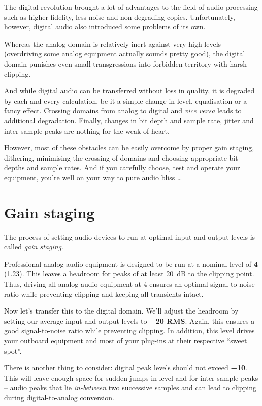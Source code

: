The digital revolution brought a lot of advantages to the field of
audio processing such as higher fidelity, less noise and non-degrading
copies.  Unfortunately, however, digital audio also introduced some
problems of its own.

Whereas the analog domain is relatively inert against very high levels
(overdriving some analog equipment actually sounds pretty good), the
digital domain punishes even small transgressions into forbidden
territory with harsh clipping.

And while digital audio can be transferred without loss in quality, it
is degraded by each and every calculation, be it a simple change in
level, equalisation or a fancy effect.  Crossing domains from analog
to digital and \emph{vice versa} leads to additional degradation.
Finally, changes in bit depth and sample rate, jitter and inter-sample
peaks are nothing for the weak of heart.

However, most of these obstacles can be easily overcome by proper gain
staging, dithering, minimising the crossing of domains and choosing
appropriate bit depths and sample rates.  And if you carefully choose,
test and operate your equipment, you're well on your way to pure audio
bliss \dots

\section{Gain staging}
\label{sec:gain_staging}

The process of setting audio devices to run at optimal input and
output levels is called \emph{gain staging}.

Professional analog audio equipment is designed to be run at a nominal
level of \textbf{\SI[retain-explicit-plus]{+4}{\dBu}}
(\SI{1.23}{\VRMS}).  This leaves a headroom for peaks of at least
\SI{20}{\dB} to the clipping point.  Thus, driving all analog audio
equipment at \SI[retain-explicit-plus]{+4}{\dBu} ensures an optimal
signal-to-noise ratio while preventing clipping and keeping all
transients intact.

Now let's transfer this to the digital domain.  We'll adjust the
headroom by setting our average input and output levels to
\textbf{\SI{-20}{\dBFS} RMS}.  Again, this ensures a good
signal-to-noise ratio while preventing clipping.  In addition, this
level drives your outboard equipment and most of your plug-ins at
their respective ``sweet spot''.

There is another thing to consider: digital peak levels should not
exceed \textbf{\SI{-10}{\dBFS}}.  This will leave enough space for
sudden jumps in level and for inter-sample peaks -- audio peaks that
lie \emph{in-between} two successive samples and can lead to clipping
during digital-to-analog conversion.

